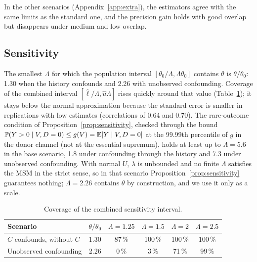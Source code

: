 In the other scenarios (Appendix~\ref{app:extra}), the estimators agree with the same limits as the standard one, and the precision gain holds with good overlap but disappears under medium and low overlap.

\subsection{Sensitivity}\label{sec:res-sensitivity}

The smallest $\Lambda$ for which the population interval $[\theta_0/\Lambda,\Lambda\theta_0]$ contains $\theta$ is $\theta/\theta_0$: 1.30 when the history confounds and 2.26 with unobserved confounding. Coverage of the combined interval $[\hat\ell/\Lambda,\hat u\Lambda]$ rises quickly around that value (Table~\ref{tab:sensitivity}); it stays below the normal approximation because the standard error is smaller in replications with low estimates (correlations of 0.64 and 0.70). The rare-outcome condition of Proposition~\ref{prop:sensitivity}, checked through the bound $\mathbb{P}(Y>0\mid V,D=0)\le g(V)=\mathbb{E}[Y\mid V,D=0]$ at the 99.99th percentile of $g$ in the donor channel (not at the essential supremum), holds at least up to $\Lambda=5.6$ in the base scenario, 1.8 under confounding through the history and 7.3 under unobserved confounding. With normal $U$, $\lambda$ is unbounded and no finite $\Lambda$ satisfies the MSM in the strict sense, so in that scenario Proposition~\ref{prop:sensitivity} guarantees nothing; $\Lambda=2.26$ contains $\theta$ by construction, and we use it only as a scale.

\begin{table}[ht]
\centering\small
\caption{Coverage of the combined sensitivity interval.}\label{tab:sensitivity}
\begin{tabular}{@{}lccccc@{}}
\toprule
Scenario & $\theta/\theta_0$ & $\Lambda=1.25$ & $\Lambda=1.5$ & $\Lambda=2$ & $\Lambda=2.5$ \\
\midrule
$C$ confounds, without $C$ & 1.30 & 87\,\% & 100\,\% & 100\,\% & 100\,\% \\
Unobserved confounding & 2.26 & 0\,\% & 3\,\% & 71\,\% & 99\,\% \\
\bottomrule
\end{tabular}
\end{table}

